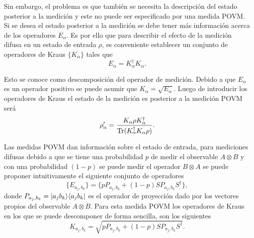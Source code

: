 Sin embargo, el problema es que también se necesita la descripción del estado
posterior a la medición y este no puede ser especificado por una medida POVM\@.
Si se desea el estado posterior a la medición se debe tener más información
acerca de los operadores $E_\alpha$. Es por
ello que para describir el efecto
de la medición difusa en un estado de entrada $\rho$, es conveniente establecer
un conjunto de operadores de Kraus $\{K_\alpha\}$ tales que
\begin{equation}E_\alpha=K_\alpha^\dagger K_\alpha.\end{equation}

Esto se conoce como descomposición del operador de medición. Debido a que
$E_\alpha$ es un operador positivo se puede asumir que
$K_\alpha=\sqrt{E_\alpha}$. Luego de introducir los operadores de Kraus el
estado de la medición es posterior a la medición POVM será
\begin{equation}\rho'_\alpha=\dfrac{K_\alpha \rho
K_\alpha^\dagger}{{\rm Tr}(K_\alpha^\dagger K_\alpha \rho)}.\end{equation}

Las medidas POVM dan información sobre el estado de entrada, para mediciones
difusas debido a que se tiene una probabilidad $p$ de medir el observable
$A\otimes B$ y con una probabilidad $(1-p)$ se puede medir el operador
$B\otimes A$ se puede proponer intuitivamente el siguiente conjunto de
operadores \begin{equation}\{E_{a_j, b_k}\}= \{p
P_{a_j,b_k}+(1-p)SP_{a_j,b_k}S^\dagger\},\end{equation} donde $P_{a_j,b_k} =
|a_j b_k\rangle \langle a_j b_k|$ es el operador de proyección dado por los vectores
propios del observable $A\otimes B$. Para esta medida POVM los operadores de
Kraus en los que se puede descomponer de forma sencilla, son los siguientes
\begin{equation}
K_{a_j, b_k}= \sqrt{p P_{a_j,b_k}+(1-p)SP_{a_j,b_k}S^\dagger}.
\end{equation}

